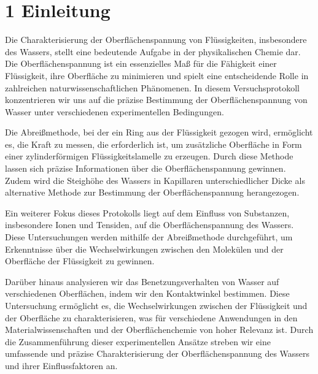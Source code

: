 \chapter*{1 Einleitung}
\setcounter{chapter}{1}
\setcounter{section}{0}
\setcounter{subsection}{0}

Die Charakterisierung der Oberflächenspannung von Flüssigkeiten, insbesondere des Wassers, stellt eine bedeutende Aufgabe in der physikalischen Chemie dar. Die Oberflächenspannung ist ein essenzielles Maß für die Fähigkeit einer Flüssigkeit, ihre Oberfläche zu minimieren und spielt eine entscheidende Rolle in zahlreichen naturwissenschaftlichen Phänomenen. In diesem Versuchsprotokoll konzentrieren wir uns auf die präzise Bestimmung der Oberflächenspannung von Wasser unter verschiedenen experimentellen Bedingungen.

Die Abreißmethode, bei der ein Ring aus der Flüssigkeit gezogen wird, ermöglicht es, die Kraft zu messen, die erforderlich ist, um zusätzliche Oberfläche in Form einer zylinderförmigen Flüssigkeitslamelle zu erzeugen. Durch diese Methode lassen sich präzise Informationen über die Oberflächenspannung gewinnen. Zudem wird die Steighöhe des Wassers in Kapillaren unterschiedlicher Dicke als alternative Methode zur Bestimmung der Oberflächenspannung herangezogen.

Ein weiterer Fokus dieses Protokolls liegt auf dem Einfluss von Substanzen, insbesondere Ionen und Tensiden, auf die Oberflächenspannung des Wassers. Diese Untersuchungen werden mithilfe der Abreißmethode durchgeführt, um Erkenntnisse über die Wechselwirkungen zwischen den Molekülen und der Oberfläche der Flüssigkeit zu gewinnen.

Darüber hinaus analysieren wir das Benetzungsverhalten von Wasser auf verschiedenen Oberflächen, indem wir den Kontaktwinkel bestimmen. Diese Untersuchung ermöglicht es, die Wechselwirkungen zwischen der Flüssigkeit und der Oberfläche zu charakterisieren, was für verschiedene Anwendungen in den Materialwissenschaften und der Oberflächenchemie von hoher Relevanz ist. Durch die Zusammenführung dieser experimentellen Ansätze streben wir eine umfassende und präzise Charakterisierung der Oberflächenspannung des Wassers und ihrer Einflussfaktoren an.